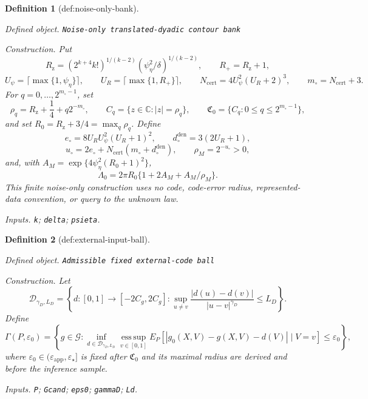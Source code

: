 \documentclass{article}
\newtheorem{definition}{Definition}
\begin{document}
\begin{definition}[def:noise-only-bank]\label{def:noise-only-bank}
\par\smallskip\noindent\emph{Defined object.} \texttt{Noise-\allowbreak{}only translated-\allowbreak{}dyadic contour bank}
\par\smallskip\noindent\emph{Construction.} Put
\[
 R_{\mathrm z}=(2^{k+4}k!)^{1/(k-2)}
 (\psi_\eta^2/\delta)^{1/(k-2)},\qquad R_+=R_{\mathrm z}+1,
\]
\[
 U_\psi=\lceil\max\{1,\psi_\eta\}\rceil,\qquad
 U_R=\lceil\max\{1,R_+\}\rceil,\qquad
 N_{\mathrm{cert}}=4U_\psi^2(U_R+2)^3,\qquad
 m_\circ=N_{\mathrm{cert}}+3.
\]
For \(q=0,\ldots,2^{m_\circ-1}\), set
\[
 \rho_q=R_{\mathrm z}+\frac14+q2^{-m_\circ},
 \qquad C_q=\{z\in\mathbb C:|z|=\rho_q\},
 \qquad \mathfrak C_0=\{C_q:0\le q\le2^{m_\circ-1}\},
\]
and set \(R_0=R_{\mathrm z}+3/4=\max_q\rho_q\). Define
\[
 e_\circ=8U_RU_\psi^2(U_R+1)^2,\qquad
 d_\circ^{\mathrm{den}}=3(2U_R+1),
\]
\[
 u_\circ=2e_\circ+N_{\mathrm{cert}}(m_\circ+d_\circ^{\mathrm{den}}),
 \qquad \rho_M=2^{-u_\circ}>0,
\]
and, with \(A_M=\exp\{4\psi_\eta^2(R_0+1)^2\}\),
\[
 \Lambda_0=2\pi R_0\{1+2A_M+A_M/\rho_M\}.
\]
This finite noise-only construction uses no code, code-error radius, represented-data convention, or query to the unknown law.
\par\smallskip\noindent\emph{Inputs.} \texttt{k}; \texttt{delta}; \texttt{psieta}.
\end{definition}

\begin{definition}[def:external-input-ball]\label{def:external-input-ball}
\par\smallskip\noindent\emph{Defined object.} \texttt{Admissible fixed external-\allowbreak{}code ball}
\par\smallskip\noindent\emph{Construction.} Let
\[
 \mathcal D_{\gamma_D,L_D}
 =\left\{d:[0,1]\to[-2C_g,2C_g]:
 \sup_{u\ne v}\frac{|d(u)-d(v)|}{|u-v|^{\gamma_D}}\le L_D\right\}.
\]
Define
\[
 \Gamma(P,\varepsilon_0)
 =\left\{g\in\mathcal G:
 \inf_{d\in\mathcal D_{\gamma_D,L_D}}
 \operatorname*{ess\,sup}_{v\in[0,1]}
 E_P[|g_0(X,V)-g(X,V)-d(V)|\mid V=v]
 \le\varepsilon_0\right\},
\]
where \(\varepsilon_0\in(\varepsilon_{\mathrm{app}},\varepsilon_\star]\) is fixed after \(\mathfrak C_0\) and its maximal radius are derived and before the inference sample.
\par\smallskip\noindent\emph{Inputs.} \texttt{P}; \texttt{Gcand}; \texttt{eps0}; \texttt{gammaD}; \texttt{Ld}.
\end{definition}
\end{document}
